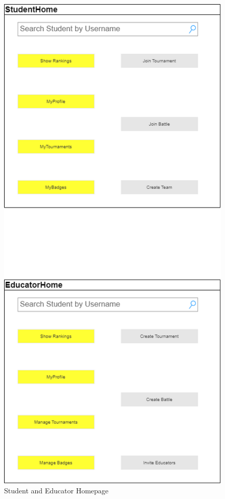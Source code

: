         \begin{figure}[H]
        \centering
        \includegraphics[scale=0.55]{images/interfaces_2.png}
        \caption{Student and Educator Homepage}
        \label{fig:home_pages}
    \end{figure}
    \clearpage

